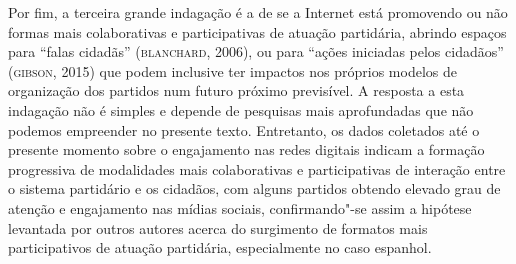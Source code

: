 Por fim, a terceira grande indagação é a de se a Internet está
promovendo ou não formas mais colaborativas e participativas de atuação
partidária, abrindo espaços para ``falas cidadãs'' (\textsc{blanchard}, 2006), ou
para ``ações iniciadas pelos cidadãos'' (\textsc{gibson}, 2015) que podem
inclusive ter impactos nos próprios modelos de organização dos partidos
num futuro próximo previsível. A resposta a esta indagação não é simples
e depende de pesquisas mais aprofundadas que não podemos empreender no
presente texto. Entretanto, os dados coletados até o presente momento
sobre o engajamento nas redes digitais indicam a formação progressiva de
modalidades mais colaborativas e participativas de interação entre o
sistema partidário e os cidadãos, com alguns partidos obtendo elevado
grau de atenção e engajamento nas mídias sociais, confirmando"-se assim a
hipótese levantada por outros autores acerca do surgimento de formatos
mais participativos de atuação partidária, especialmente no caso
espanhol.



